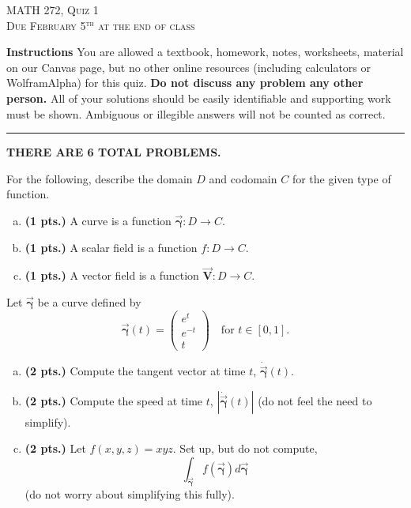 \documentclass[12pt]{amsbook}
\newcommand{\vecfieldV}{\boldsymbol{\vec{V}}}
\newcommand{\curvegamma}{\boldsymbol{\vec{\gamma}}}
\newcommand{\tangentgamma}{\boldsymbol{\dot{\vec{\gamma}}}}
\begin{document}

\begin{center}
   \textsc{\large MATH 272, Quiz 1}\\
   \textsc{Due February 5$^\textrm{th}$ at the end of class}
\end{center}

\vspace{1cm}

\noindent\textbf{Instructions} \; You are allowed a textbook, homework, notes, worksheets, material on our Canvas page, but no other online resources (including calculators or WolframAlpha) for this quiz.  \textbf{Do not discuss any problem any other person.} All of your solutions should be easily identifiable and supporting work must be shown.  Ambiguous or illegible answers will not be counted as correct.


\vspace*{.5cm}
\hrule
\vspace*{.5cm}

\begin{center}\textbf{\large THERE ARE 6 TOTAL PROBLEMS.}\normalsize \end{center}

\begin{problem}
For the following, describe the domain $D$ and codomain $C$ for the given type of function.
\begin{enumerate}[(a)]
        \item \textbf{(1 pts.)} A curve is a function $\curvegamma \colon D \to C$.
        \item \textbf{(1 pts.)} A scalar field is a function $f \colon D \to C$.
        \item \textbf{(1 pts.)} A vector field is a function $\vecfieldV \colon D \to C$.
\end{enumerate}
\end{problem}

\begin{problem}
    Let $\curvegamma$ be a curve defined by
    \[
    \curvegamma(t) = \begin{pmatrix} e^t \\ e^{-t} \\ t \end{pmatrix} \quad \textrm{for $t\in [0,1]$.}
    \]
    \begin{enumerate}[(a)]
        \item \textbf{(2 pts.)} Compute the tangent vector at time $t$, $\tangentgamma(t)$.
        \item \textbf{(2 pts.)} Compute the speed at time $t$, $\left| \tangentgamma(t) \right|$ (do not feel the need to simplify).
        \item \textbf{(2 pts.)} Let $f(x,y,z) = xyz$. Set up, but do not compute,
        \[
        \int_{\curvegamma} f(\curvegamma) d\curvegamma
        \]
        (do not worry about simplifying this fully).
    \end{enumerate}
\end{problem}
\end{document}
